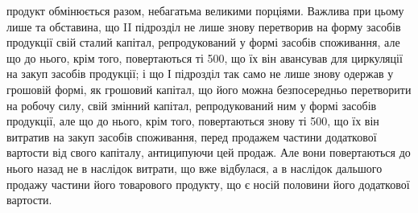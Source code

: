продукт обмінюється разом, небагатьма великими порціями. Важлива
при цьому лише та обставина, що II підрозділ не лише знову перетворив
на форму засобів продукції свій сталий капітал, репродукований
у формі засобів споживання, але що до нього, крім того, повертаються
ті 500, що їх він авансував для циркуляції на закуп засобів
продукції; і що І підрозділ так само не лише знову одержав у грошовій
формі, як грошовий капітал, що його можна безпосередньо перетворити
на робочу силу, свій змінний капітал, репродукований ним у формі засобів
продукції, але що до нього, крім того, повертаються знову ті
500, що їх він витратив на закуп засобів споживання, перед продажем
частини додаткової вартости від свого капіталу, антиципуючи цей
продаж. Але вони повертаються до нього назад не в наслідок витрати,
що вже відбулася, а в наслідок дальшого продажу частини його товарового
продукту, що є носій половини його додаткової вартости.

